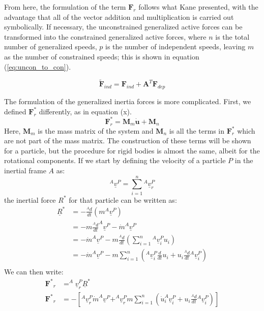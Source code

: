 \documentclass[twocolumn,10pt]{asme2e}
\begin{document}
From here, the formulation of the term $\mathbf{F}_r$ follows what Kane
presented, with the advantage that all of the vector addition and
multiplication is carried out symbolically.
If necessary, the unconstrained generalized active forces can be transformed
into the constrained generalized active forces, where $n$ is the total number of
generalized speeds, $p$ is the number of independent speeds, leaving $m$ as the
number of constrained speeds; this is shown in equation (\ref{eq:uncon_to_con}).

\begin{equation}
\label{eq:uncon_to_con}
\tilde{\mathbf{F}}_{ind} = \mathbf{F}_{ind} + \mathbf{A}^{T}
\mathbf{F}_{dep}
\end{equation}

The formulation of the generalized inertia forces is more complicated.
First, we defined $\mathbf{F}_r^*$ differently, as in equation (x).
\begin{equation}
\mathbf{F}_r^* = \mathbf{M}_m \mathbf{\dot{u}} + \mathbf{M}_n
\end{equation}
Here, $\mathbf{M}_m$ is the mass matrix of the system and $\mathbf{M}_n$ is all
the terms in $\mathbf{F}_r^*$ which are not part of the mass matrix.
The construction of these terms will be shown for a particle, but the procedure
for rigid bodies is almost the same, albeit for the rotational components.
If we start by defining the velocity of a particle $P$ in the inertial frame
$A$ as:
\begin{equation}
^{A}\underline{v}^{P} = \sum_{i=1}^{n} {} ^{A}\underline{v}_{r}^{P}
\end{equation}
the inertial force $R^*$ for that particle can be written as:
\begin{align}
\underline{R}^* &= -\frac{^{A} d}{dt}(m ^A\underline{v}^P) \\
&= -m \frac{^{A}d}{dt}^A\underline{v}^P - \dot{m} ^A\underline{v}^P \\
&= -\dot{m} ^A\underline{v}^P - m \frac{^{A}d}{dt}\left(\sum_{i=1}^{n}{} ^A
\underline{v}^P_i u_i \right) \\
&= -\dot{m} ^A\underline{v}^P - m \sum_{i=1}^{n} \left( ^A\underline{v}_i^P
\frac{d}{dt}u_i + u_i \frac{^{A}d}{dt} {}^A\underline{v}^P_i \right) \\
\end{align}
We can then write:
\begin{align}
\mathbf{F^*}_r &= ^A\underline{v}^P_r \underline{R}^{*} \\
\mathbf{F^*}_r &= - \left[
                   ^A\underline{v}^P_r \dot{m} ^A\underline{v}^P +
                   ^A\underline{v}^P_r m \sum_{i=1}^{n} \left(
                   \dot{u}_i ^A\underline{v}^P_i + u_i
                   \frac{^{A}d}{dt} {}^A\underline{v}^P_i
                   \right)
                   \right]
\end{align}
\end{document}
